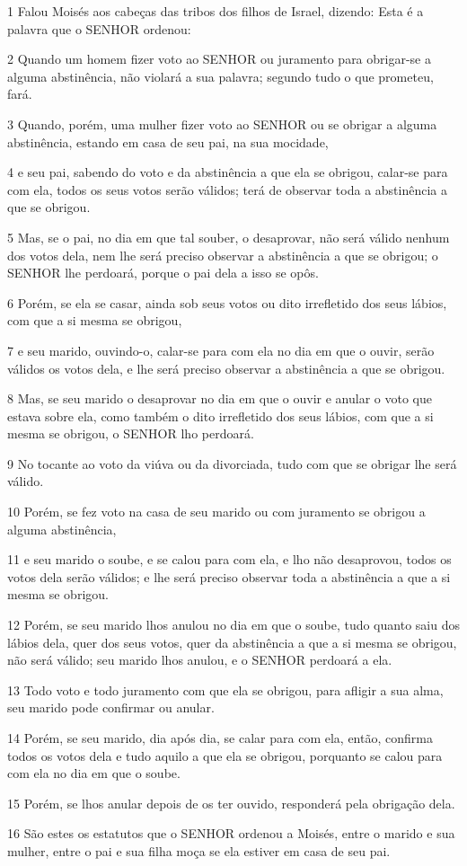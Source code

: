 \par 1 Falou Moisés aos cabeças das tribos dos filhos de Israel, dizendo: Esta é a palavra que o SENHOR ordenou:
\par 2 Quando um homem fizer voto ao SENHOR ou juramento para obrigar-se a alguma abstinência, não violará a sua palavra; segundo tudo o que prometeu, fará.
\par 3 Quando, porém, uma mulher fizer voto ao SENHOR ou se obrigar a alguma abstinência, estando em casa de seu pai, na sua mocidade,
\par 4 e seu pai, sabendo do voto e da abstinência a que ela se obrigou, calar-se para com ela, todos os seus votos serão válidos; terá de observar toda a abstinência a que se obrigou.
\par 5 Mas, se o pai, no dia em que tal souber, o desaprovar, não será válido nenhum dos votos dela, nem lhe será preciso observar a abstinência a que se obrigou; o SENHOR lhe perdoará, porque o pai dela a isso se opôs.
\par 6 Porém, se ela se casar, ainda sob seus votos ou dito irrefletido dos seus lábios, com que a si mesma se obrigou,
\par 7 e seu marido, ouvindo-o, calar-se para com ela no dia em que o ouvir, serão válidos os votos dela, e lhe será preciso observar a abstinência a que se obrigou.
\par 8 Mas, se seu marido o desaprovar no dia em que o ouvir e anular o voto que estava sobre ela, como também o dito irrefletido dos seus lábios, com que a si mesma se obrigou, o SENHOR lho perdoará.
\par 9 No tocante ao voto da viúva ou da divorciada, tudo com que se obrigar lhe será válido.
\par 10 Porém, se fez voto na casa de seu marido ou com juramento se obrigou a alguma abstinência,
\par 11 e seu marido o soube, e se calou para com ela, e lho não desaprovou, todos os votos dela serão válidos; e lhe será preciso observar toda a abstinência a que a si mesma se obrigou.
\par 12 Porém, se seu marido lhos anulou no dia em que o soube, tudo quanto saiu dos lábios dela, quer dos seus votos, quer da abstinência a que a si mesma se obrigou, não será válido; seu marido lhos anulou, e o SENHOR perdoará a ela.
\par 13 Todo voto e todo juramento com que ela se obrigou, para afligir a sua alma, seu marido pode confirmar ou anular.
\par 14 Porém, se seu marido, dia após dia, se calar para com ela, então, confirma todos os votos dela e tudo aquilo a que ela se obrigou, porquanto se calou para com ela no dia em que o soube.
\par 15 Porém, se lhos anular depois de os ter ouvido, responderá pela obrigação dela.
\par 16 São estes os estatutos que o SENHOR ordenou a Moisés, entre o marido e sua mulher, entre o pai e sua filha moça se ela estiver em casa de seu pai.

